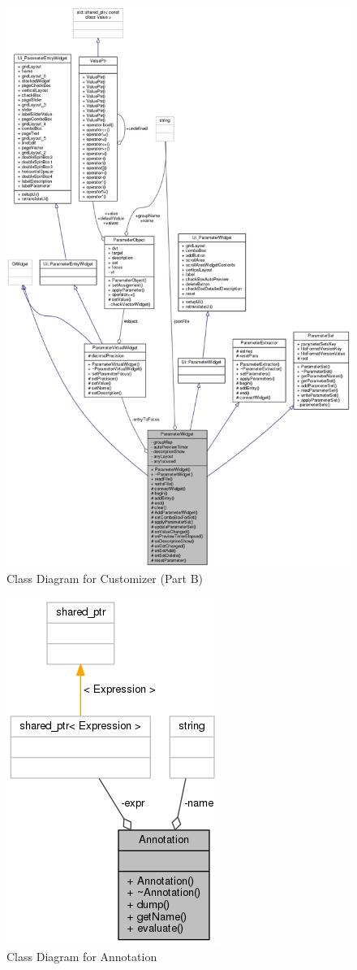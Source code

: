 \begin{figure}
    \centering
    \includegraphics[scale=0.39]{images/collaborative}
    \caption{Class Diagram for Customizer (Part B)}
    \label{fig:collaborative}
\end{figure}
\begin{figure}
\centering
\includegraphics[width=0.4\linewidth]{images/classAnnotation__coll__graph}
\caption{Class Diagram for Annotation}
\label{fig:classAnnotation__coll__graph}
\end{figure}